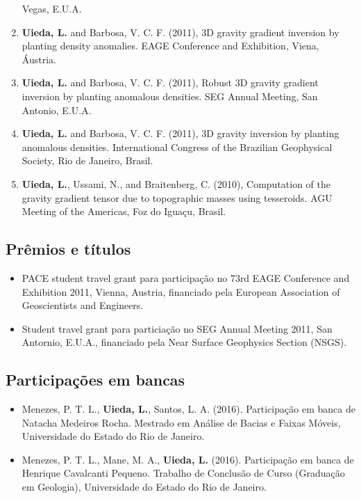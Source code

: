 \documentclass[12pt,a4paper,oneside,titlepage,onecolumn]{article}
\begin{document}
\begin{enumerate}
    Vegas, E.U.A.
\item \textbf{Uieda, L.} and Barbosa, V. C. F. (2011), 3D gravity gradient
    inversion by planting density anomalies. EAGE Conference and Exhibition,
    Viena, Áustria.
\item \textbf{Uieda, L.} and Barbosa, V. C. F. (2011), Robust 3D gravity
    gradient inversion by planting anomalous densities. SEG Annual Meeting, San
    Antonio, E.U.A.
\item \textbf{Uieda, L.} and Barbosa, V. C. F. (2011), 3D gravity inversion by
    planting anomalous densities. International Congress of the Brazilian
    Geophysical Society, Rio de Janeiro, Brasil.
\item \textbf{Uieda, L.}, Ussami, N., and Braitenberg, C. (2010), Computation
    of the gravity gradient tensor due to topographic masses using tesseroids.
    AGU Meeting of the Americas, Foz do Iguaçu, Brasil.
\end{enumerate}


\subsection{Prêmios e títulos}

\begin{itemize}
\item PACE student travel grant para participação no 73rd EAGE Conference and
    Exhibition 2011, Vienna, Austria, financiado pela European Association of
    Geoscientists and Engineers.
\item Student travel grant para particiação no SEG Annual Meeting 2011, San
    Antornio, E.U.A., financiado pela Near Surface Geophysics Section (NSGS).
\end{itemize}


\subsection{Participações em bancas}

\begin{itemize}
\item Menezes, P. T. L., \textbf{Uieda, L.}, Santos, L. A. (2016).
    Participação em banca de Natacha Medeiros Rocha. Mestrado em Análise de
    Bacias e Faixas Móveis, Universidade do Estado do Rio de Janeiro.
\item Menezes, P. T. L., Mane, M. A., \textbf{Uieda, L.} (2016).  Participação
    em banca de Henrique Cavalcanti Pequeno. Trabalho de Conclusão de Curso
    (Graduação em Geologia), Universidade do Estado do Rio de Janeiro.
\end{itemize}
\end{document}
